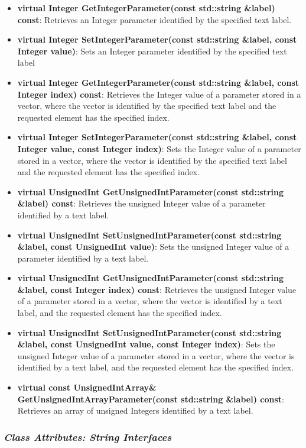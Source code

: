 \begin{itemize}
{const}: Retrieves an array of unsigned Integers identified by the specified ID.
\item \textbf{virtual Integer GetIntegerParameter(const std::string \&label) const}: Retrieves an
Integer parameter identified by the specified text label.
\item \textbf{virtual Integer SetIntegerParameter(const std::string \&label, const Integer
value)}: Sets an Integer parameter identified by the specified text label
\item \textbf{virtual Integer GetIntegerParameter(const std::string \&label, const Integer index)
const}: Retrieves the Integer value of a parameter stored in a vector, where the vector is
identified by the specified text label and the requested element has the specified index.
\item \textbf{virtual Integer SetIntegerParameter(const std::string \&label, const Integer value,
const Integer index)}: Sets the Integer value of a parameter stored in a vector, where the vector is
identified by the specified text label and the requested element has the specified index.
\item \textbf{virtual UnsignedInt GetUnsignedIntParameter(const std::string \&label) const}:
Retrieves the unsigned Integer value of a parameter identified by a text label.
\item \textbf{virtual UnsignedInt SetUnsignedIntParameter(const std::string \&label, const
UnsignedInt value)}: Sets the unsigned Integer value of a parameter identified by a text label.
\item \textbf{virtual UnsignedInt GetUnsignedIntParameter(const std::string \&label, const Integer
index) const}: Retrieves the unsigned Integer value of a parameter stored in a vector, where the
vector is identified by a text label, and the requested element has the specified index.
\item \textbf{virtual UnsignedInt SetUnsignedIntParameter(const std::string \&label, const
UnsignedInt value, const Integer index)}: Sets the unsigned Integer value of a parameter stored in a
vector, where the vector is identified by a text label, and the requested element has the specified
index.
\item \textbf{virtual const UnsignedIntArray\& GetUnsignedIntArrayParameter(const std::string
\&label) const}: Retrieves an array of unsigned Integers identified by a text label.
\end{itemize}

\subsubsection{\textit{Class Attributes: String Interfaces}}

